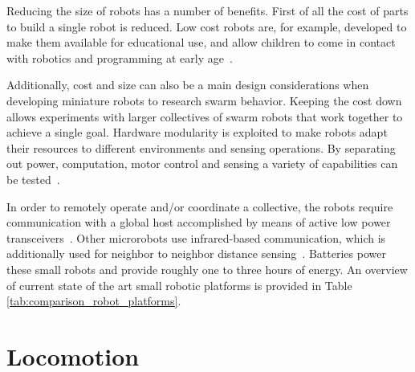 




Reducing the size of robots has a number of benefits.
First of all the cost of parts to build a single robot is reduced.
Low cost robots are, for example, developed to make them available for educational use, and allow children to come in contact with robotics and programming at early age~\cite{rubenstein_icra_2015}.

Additionally, cost and size can also be a main design considerations when developing miniature robots to research swarm behavior.
Keeping the cost down allows experiments with larger collectives of swarm robots that work together to achieve a single goal.
Hardware modularity is exploited to make robots adapt their resources to different environments and sensing operations.
By separating out power, computation, motor control and sensing a variety of capabilities can be tested~\cite{sabelhaus_icra_2013, pickem_icra_2015, kim_iros_2016}.

In order to remotely operate and/or coordinate a collective, the robots require communication with a global host accomplished by means of active low power transceivers~\cite{sabelhaus_icra_2013, pickem_icra_2015, kim_iros_2016}. 
Other microrobots use infrared-based communication, which is additionally used for neighbor to neighbor distance sensing~\cite{rubenstein_icra_2012}.
Batteries power these small robots and provide roughly one to three hours of energy.
An overview of current state of the art small robotic platforms is provided in Table \ref{tab:comparison_robot_platforms}.


\section{Locomotion}
\label{sec:rw_locomotion}


